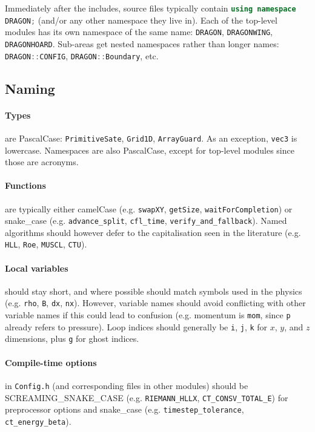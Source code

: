 \documentclass[11pt]{report}
\newcommand{\cpp}[1]{\lstinline[language=C++]{#1}}
\newcommand{\bash}[1]{\lstinline[language=bash]{#1}}
\begin{document}
Immediately after the includes, source files typically contain \cpp{using namespace DRAGON;} (and/or any other namespace they live in).
Each of the top-level modules has its own namespace of the same name: \cpp{DRAGON}, \cpp{DRAGONWING}, \cpp{DRAGONHOARD}. 
Sub-areas get nested namespaces rather than longer names: \cpp{DRAGON::CONFIG}, \cpp{DRAGON::Boundary}, etc. 

\subsection{Naming}

\paragraph{Types}are PascalCase: \cpp{PrimitiveSate}, \cpp{Grid1D}, \cpp{ArrayGuard}. As an exception, \cpp{vec3} is lowercase. Namespaces are also PascalCase, except for top-level modules since those are acronyms.

\paragraph{Functions}are typically either camelCase (e.g. \cpp{swapXY}, \cpp{getSize}, \cpp{waitForCompletion}) or snake\_case (e.g. \cpp{advance_split}, \cpp{cfl_time}, \cpp{verify_and_fallback}). Named algorithms should however defer to the capitalisation seen in the literature (e.g. \cpp{HLL}, \cpp{Roe}, \cpp{MUSCL}, \cpp{CTU}).

\paragraph{Local variables} should stay short, and where possible should match symbols used in the physics (e.g. \cpp{rho}, \cpp{B}, \cpp{dx}, \cpp{nx}). 
However, variable names should avoid conflicting with other variable names if this could lead to confusion (e.g. momentum is \cpp{mom}, since \cpp{p} already refers to pressure). 
Loop indices should generally be \cpp{i}, \cpp{j}, \cpp{k} for $x$, $y$, and $z$ dimensions, plus \cpp{g} for ghost indices.


\paragraph{Compile-time options} in \bash{Config.h} (and corresponding files in other modules) should be SCREAMING\_SNAKE\_CASE (e.g. \cpp{RIEMANN_HLLX}, \cpp{CT_CONSV_TOTAL_E}) for preprocessor options and snake\_case (e.g. \cpp{timestep_tolerance}, \cpp{ct_energy_beta}).
\end{document}
